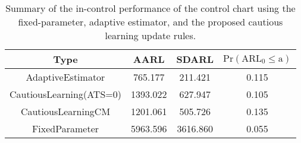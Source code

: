 \begin{table}[!h]

\caption{Summary of the in-control performance of the control chart using the fixed-parameter, adaptive estimator, and the proposed cautious learning update rules.}
\centering
\begin{tabular}[t]{cccc}
\toprule
Type & AARL & SDARL & $\text{Pr}(\text{ARL}_0 \leq \text{a})$\\
\midrule
AdaptiveEstimator & 765.177 & 211.421 & 0.115\\
CautiousLearning(ATS=0) & 1393.022 & 627.947 & 0.105\\
CautiousLearningCM & 1201.061 & 505.726 & 0.135\\
FixedParameter & 5963.596 & 3616.860 & 0.055\\
\bottomrule
\end{tabular}
\end{table}
